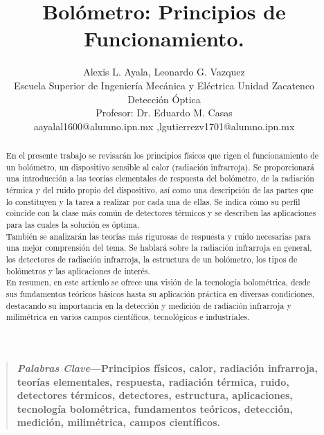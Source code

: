 \documentclass[a4paper,journal]{IEEEtran}
\begin{document}
\title{Bolómetro: Principios de Funcionamiento.\\}
\author{Alexis L. Ayala, Leonardo G. Vazquez\\Escuela Superior de Ingeniería Mecánica y Eléctrica Unidad Zacatenco\\ Detección Óptica\\Profesor: Dr. Eduardo M. Casas\\ aayalal1600@alumno.ipn.mx ,lgutierrezv1701@alumno.ipn.mx}
\maketitle
\begin{abstract}
En el presente trabajo se revisarán los principios físicos que rigen el funcionamiento de un bolómetro, un dispositivo sensible al calor (radiación infrarroja). 
Se proporcionará una introducción a las teorías elementales de respuesta del bolómetro, de la radiación térmica y del ruido propio del dispositivo, así como una descripción de las partes que lo constituyen y la tarea a realizar por cada una de ellas. Se indica cómo su perfil coincide con la clase más común de detectores térmicos y se describen las aplicaciones para las cuales la solución es óptima. \\
También se analizarán las teorías más rigurosas de respuesta y ruido necesarias para una mejor comprensión del tema. Se hablará sobre la radiación infrarroja en general, los detectores de radiación infrarroja, la estructura de un bolómetro, los tipos de bolómetros y las aplicaciones de interés. \\
En resumen, en este artículo se ofrece una visión de la tecnología bolométrica, desde sus fundamentos teóricos básicos hasta su aplicación práctica en diversas condiciones, destacando su importancia en la detección y medición de radiación infrarroja y milimétrica en varios campos científicos, tecnológicos e industriales. 
\end{abstract}
\begin{quote}
        \bf
        \small
        \emph{Palabras Clave}—Principios físicos, calor, radiación infrarroja, teorías elementales, respuesta, radiación térmica, ruido, detectores térmicos, detectores, estructura, aplicaciones, tecnología bolométrica, fundamentos teóricos, detección, medición, milimétrica, campos científicos. 
\end{quote}
\end{document}
